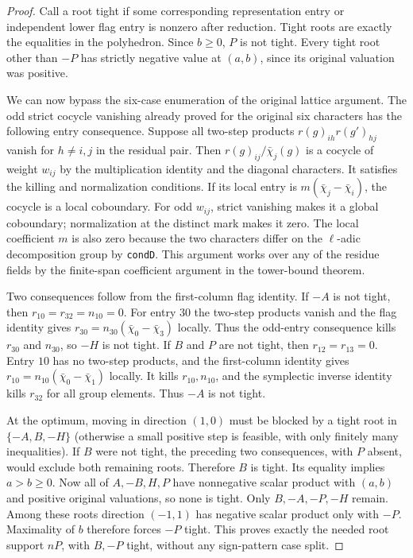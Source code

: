 \begin{proof}
Call a root tight if some corresponding representation
entry or independent lower flag entry is nonzero after
reduction. Tight roots are exactly the equalities in the
polyhedron. Since $b\ge0$, $P$ is not tight. Every tight
root other than $-P$ has strictly negative value at
$(a,b)$, since its original valuation was positive.

We can now bypass the six-case enumeration of the original
lattice argument. The odd strict cocycle vanishing already
proved for the original six characters has the following
entry consequence. Suppose all two-step products
$r(g)_{ih}r(g')_{hj}$ vanish for $h\ne i,j$ in the residual
pair. Then $r(g)_{ij}/\bar\chi_j(g)$ is a cocycle of weight
$w_{ij}$ by the multiplication identity and the diagonal
characters. It satisfies the killing and normalization
conditions. If its local entry is
$m(\bar\chi_j-\bar\chi_i)$, the cocycle is a local
coboundary. For odd $w_{ij}$, strict vanishing makes it
a global coboundary; normalization at the distinct mark
makes it zero. The local coefficient $m$ is also zero
because the two characters differ on the $\ell$-adic
decomposition group by \texttt{condD}. This argument
works over any of the residue fields by the finite-span
coefficient argument in the tower-bound theorem.

Two consequences follow from the first-column flag identity.
If $-A$ is not tight, then $r_{10}=r_{32}=n_{10}=0$.
For entry $30$ the two-step products vanish and the
flag identity gives $r_{30}=n_{30}(\bar\chi_0-\bar\chi_3)$
locally. Thus the odd-entry consequence kills $r_{30}$
and $n_{30}$, so $-H$ is not tight. If $B$ and $P$ are
not tight, then $r_{12}=r_{13}=0$. Entry $10$ has no
two-step products, and the first-column identity gives
$r_{10}=n_{10}(\bar\chi_0-\bar\chi_1)$ locally.
It kills $r_{10},n_{10}$, and the symplectic inverse
identity kills $r_{32}$ for all group elements.
Thus $-A$ is not tight.

At the optimum, moving in direction $(1,0)$ must
be blocked by a tight root in $\{-A,B,-H\}$ (otherwise a
small positive step is feasible, with only finitely many
inequalities). If $B$ were not tight, the preceding two
consequences, with $P$ absent, would exclude both remaining
roots. Therefore $B$ is tight. Its equality implies
$a>b\ge0$. Now all of $A,-B,H,P$ have nonnegative scalar
product with $(a,b)$ and positive original valuations,
so none is tight. Only $B,-A,-P,-H$ remain. Among these
roots direction $(-1,1)$ has negative scalar product
only with $-P$. Maximality of $b$ therefore forces
$-P$ tight. This proves exactly the needed root support
$nP$, with $B,-P$ tight, without any sign-pattern case split.


\end{proof}
